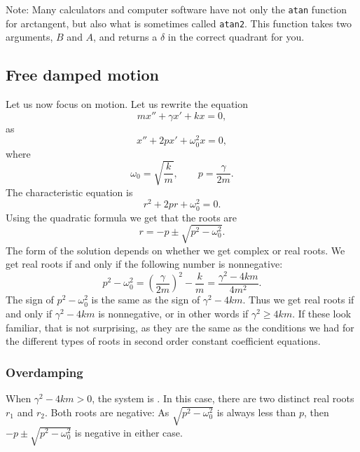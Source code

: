 \documentclass{ximera}
\begin{document}
Note: Many calculators and computer software have not only the \texttt{atan} function for arctangent, but also what is sometimes called \texttt{atan2}. This function takes two arguments, $B$ and $A$, and returns a $\delta$ in the correct quadrant for you.

\subsection{Free damped motion}


Let us now focus on  motion.  Let us rewrite the equation
\begin{equation*}
    m x'' + \gamma x' + kx = 0,
\end{equation*}
as
\begin{equation*}
    x'' + 2p x' + \omega_0^2 x = 0,
\end{equation*}
where
\begin{equation*}
    \omega_0 = \sqrt{\frac{k}{m}}, \qquad p = \frac{\gamma}{2m} .
\end{equation*}
The characteristic equation is
\begin{equation*}
    r^2 + 2 pr + \omega_0^2 = 0 .
\end{equation*}
Using the quadratic formula we get that the roots are
\begin{equation*}
    r = -p \pm \sqrt{p^2 - \omega_0^2} .
\end{equation*}
The form of the solution depends on whether we get complex or real roots. We get real roots if and only if the following number is nonnegative:
\begin{equation*}
    p^2 - \omega_0^2 = {\left( \frac{\gamma}{2m} \right)}^2 - \frac{k}{m} = \frac{\gamma^2 - 4km}{4m^2} .
\end{equation*}
The sign of $p^2-\omega_0^2$ is the same as the sign of $\gamma^2 - 4km$.  Thus we get real roots if and only if $\gamma^2-4km$ is nonnegative, or in other words if $\gamma^2 \geq 4km$. If these look familiar, that is not surprising, as they are the same as the conditions we had for the different types of roots in second order constant coefficient equations.

\subsubsection{Overdamping}

When $\gamma^2 - 4km > 0$, the system is \emph{}.  In this case, there are two distinct real roots $r_1$ and $r_2$.  Both roots are negative:  As $\sqrt{p^2 - \omega_0^2}$ is always less than $p$, then $-p \pm \sqrt{p^2 - \omega_0^2}$ is negative in either case.
\end{document}
